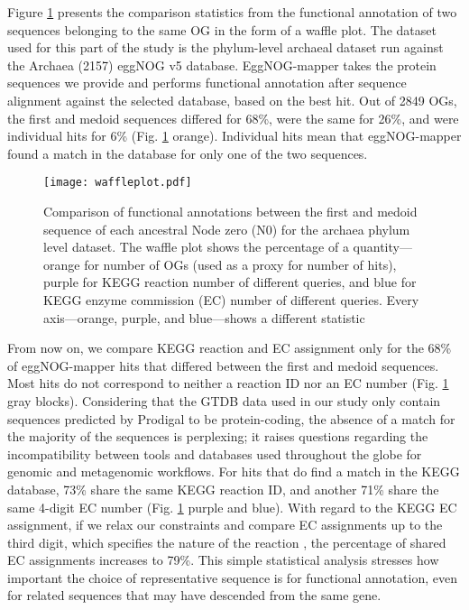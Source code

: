 Figure \ref{waffleplot} presents the comparison statistics from the functional annotation of two sequences belonging to the same OG in the form of a waffle plot. The dataset used for this part of the study is the phylum-level archaeal dataset run against the Archaea (2157) eggNOG v5 database. EggNOG-mapper takes the protein sequences we provide and performs functional annotation after sequence alignment against the selected database, based on the best hit. Out of 2849 OGs, the first and medoid sequences differed for 68\%, were the same for 26\%, and were individual hits for 6\% (Fig. \ref{waffleplot} orange). Individual hits mean that eggNOG-mapper found a match in the database for only one of the two sequences.

\begin{figure}[H]
    \centering
    \texttt{[image: waffleplot.pdf]}
    \caption{Comparison of functional annotations between the first and medoid sequence of each ancestral Node zero (N0) for the archaea phylum level dataset. The waffle plot shows the percentage of a quantity---orange for number of OGs (used as a proxy for number of hits), purple for KEGG reaction number of different queries, and blue for KEGG enzyme commission (EC) number of different queries.  
    Every axis---orange, purple, and blue---shows a different statistic}
    \label{waffleplot}
\end{figure} 

From now on, we compare KEGG reaction and EC assignment only for the 68\% of eggNOG-mapper hits that differed between the first and medoid sequences. Most hits do not correspond to neither a reaction ID nor an EC number (Fig. \ref{waffleplot} gray blocks). Considering that the GTDB data used in our study only contain sequences predicted by Prodigal to be protein-coding, the absence of a match for the majority of the sequences is perplexing; it raises questions regarding the incompatibility between tools and databases used throughout the globe for genomic and metagenomic workflows. For hits that do find a match in the KEGG database, 73\% share the same KEGG reaction ID, and another 71\% share the same 4-digit EC number (Fig. \ref{waffleplot} purple and blue). With regard to the KEGG EC assignment, if we relax our constraints and compare EC assignments up to the third digit, which specifies the nature of the reaction \cite{mcdonald2009}, the percentage of shared EC assignments increases to 79\%. This simple statistical analysis stresses how important the choice of representative sequence is for functional annotation, even for related sequences that may have descended from the same gene.  

